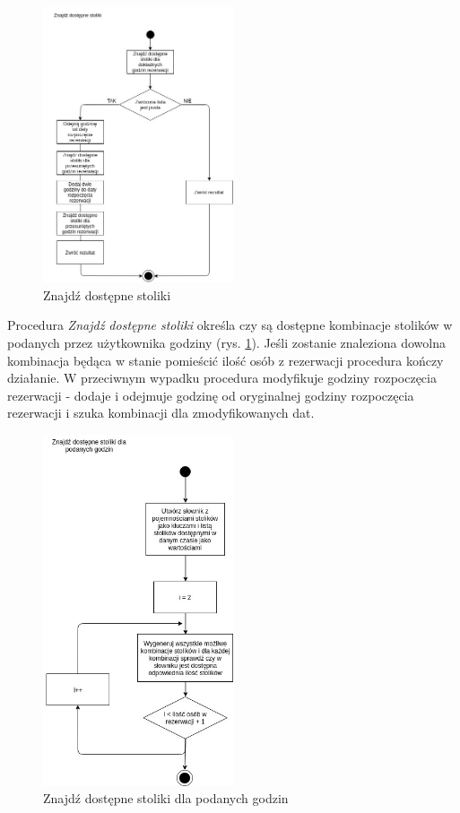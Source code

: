 \documentclass{article}
\begin{document}
\begin{figure}[H]
\centering
	\includegraphics[width=0.50\textwidth]{algo2.jpg}
	\caption[caption]{Znajdź dostępne stoliki}
	\label{fig:alg2}
\end{figure}

Procedura \textit{Znajdź dostępne stoliki} określa czy są dostępne kombinacje stolików w podanych przez użytkownika godziny (rys. \ref{fig:alg2}). Jeśli zostanie znaleziona dowolna kombinacja będąca w stanie pomieścić ilość osób z rezerwacji procedura kończy działanie. W przeciwnym wypadku procedura modyfikuje godziny rozpoczęcia rezerwacji - dodaje i odejmuje godzinę od oryginalnej godziny rozpoczęcia rezerwacji i szuka kombinacji dla zmodyfikowanych dat.


\begin{figure}[H]
\centering
	\includegraphics[width=0.50\textwidth]{algo3.jpg}
	\caption[caption]{Znajdź dostępne stoliki dla podanych godzin}
	\label{fig:alg3}
\end{figure}
\end{document}
